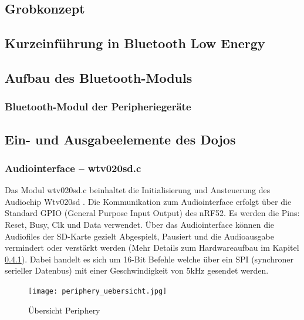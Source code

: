\subsection{Grobkonzept}

\subsection{Kurzeinführung in Bluetooth Low Energy}

\subsection{Aufbau des Bluetooth-Moduls}

\subsubsection{Bluetooth-Modul der Peripheriegeräte}

\subsection{Ein- und Ausgabeelemente des Dojos}

\subsubsection{Audiointerface -- wtv020sd.c}
Das Modul wtv020sd.c beinhaltet die Initialisierung und Ansteuerung des Audiochip Wtv020sd \cite{WTV020}. Die Kommunikation zum Audiointerface erfolgt über die Standard GPIO (General Purpose Input Output) des nRF52. Es werden die Pins: Reset, Busy, Clk und Data verwendet. Über das Audiointerface können die Audiofiles der SD-Karte gezielt Abgespielt, Pausiert und die Audioausgabe vermindert oder verstärkt werden (Mehr Details zum Hardwareaufbau im Kapitel \ref{}). Dabei handelt es sich um 16-Bit Befehle welche über ein SPI (synchroner serieller Datenbus) mit einer Geschwindigkeit von 5kHz gesendet werden.


\begin{figure}[htb]
\begin{center}
\texttt{[image: periphery\_uebersicht.jpg]}
\caption{Übersicht Periphery} %
\label{fig:p_uebersicht}
\end{center}
\end{figure}

